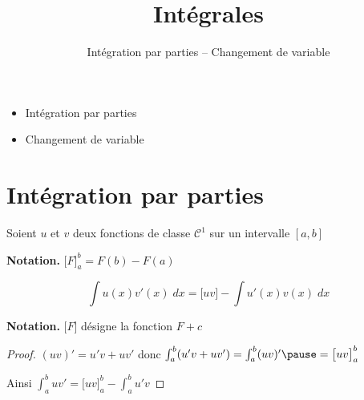 









\title{{\bf Intégrales}}
\subtitle{Intégration par parties -- Changement de variable}

\begin{frame}
  
  \debutmontitre

  \pause

{\footnotesize
\hfill
{}
\begin{minipage}{0.6\textwidth}
  \begin{itemize}
    \item<3-> Intégration par parties
    \item<4-> Changement de variable
  \end{itemize}
\end{minipage}
}

\end{frame}

\setcounter{framenumber}{0}





\section*{Intégration par parties}


\begin{frame}
\begin{theoreme}
Soient $u$ et $v$ deux fonctions de classe $\mathcal{C}^1$ sur un intervalle $[a,b]$

\end{theoreme} 

\pause

\textbf{Notation.}  $\big[F\big]_a^b=F(b)-F(a)$

\pause

$$\int u(x)v'(x)\;dx= \big[uv\big] - \int u'(x)v(x)\;dx$$

\pause

\textbf{Notation.}  $\big[F\big]$ désigne la fonction $F+c$

\pause

\begin{proof}
$(uv)'=u'v+uv'$  \pause donc $\int_a^b (u'v+uv')=\int_a^b (uv)' \pause =\big[uv\big]_a^b$

\pause

Ainsi $\int_a^b uv'= \big[uv\big]_a^b - \int_a^b u'v$
\end{proof}

\end{frame}



